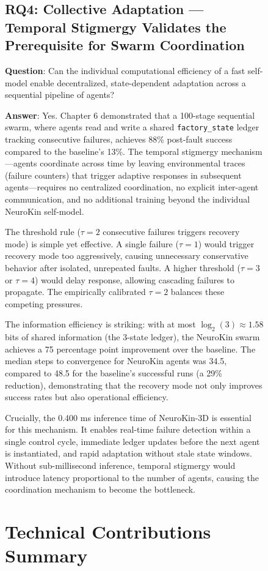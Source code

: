 \documentclass[12pt,a4paper,oneside]{report}
\begin{document}
\begin{figure}[H]
\subsection{RQ4: Collective Adaptation --- Temporal Stigmergy Validates the Prerequisite for Swarm Coordination}

\textbf{Question}: Can the individual computational efficiency of a fast self-model enable decentralized, state-dependent adaptation across a sequential pipeline of agents?

\textbf{Answer}: Yes. Chapter 6 demonstrated that a 100-stage sequential swarm, where agents read and write a shared \texttt{factory\_state} ledger tracking consecutive failures, achieves 88\% post-fault success compared to the baseline's 13\%. The temporal stigmergy mechanism---agents coordinate across time by leaving environmental traces (failure counters) that trigger adaptive responses in subsequent agents---requires no centralized coordination, no explicit inter-agent communication, and no additional training beyond the individual NeuroKin self-model.

The threshold rule ($\tau = 2$ consecutive failures triggers recovery mode) is simple yet effective. A single failure ($\tau = 1$) would trigger recovery mode too aggressively, causing unnecessary conservative behavior after isolated, unrepeated faults. A higher threshold ($\tau = 3$ or $\tau = 4$) would delay response, allowing cascading failures to propagate. The empirically calibrated $\tau = 2$ balances these competing pressures.

The information efficiency is striking: with at most $\log_2(3) \approx 1.58$ bits of shared information (the 3-state ledger), the NeuroKin swarm achieves a 75 percentage point improvement over the baseline. The median steps to convergence for NeuroKin agents was 34.5, compared to 48.5 for the baseline's successful runs (a 29\% reduction), demonstrating that the recovery mode not only improves success rates but also operational efficiency.

Crucially, the 0.400 ms inference time of NeuroKin-3D is essential for this mechanism. It enables real-time failure detection within a single control cycle, immediate ledger updates before the next agent is instantiated, and rapid adaptation without stale state windows. Without sub-millisecond inference, temporal stigmergy would introduce latency proportional to the number of agents, causing the coordination mechanism to become the bottleneck.

\section{Technical Contributions Summary}


\end{figure}
\end{document}
